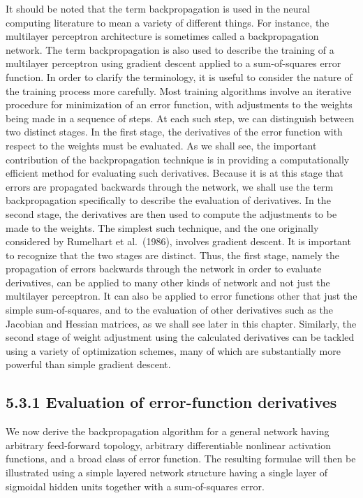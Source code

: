 \documentclass[
  10
]{article}
\begin{document}
It should be noted that the term backpropagation is used in the neural
computing literature to mean a variety of different things. For
instance, the multilayer perceptron architecture is sometimes called a
backpropagation network. The term backpropagation is also used to
describe the training of a multilayer perceptron using gradient descent
applied to a sum-of-squares error function. In order to clarify the
terminology, it is useful to consider the nature of the training process
more carefully. Most training algorithms involve an iterative procedure
for minimization of an error function, with adjustments to the weights
being made in a sequence of steps. At each such step, we can distinguish
between two distinct stages. In the first stage, the derivatives of the
error function with respect to the weights must be evaluated. As we
shall see, the important contribution of the backpropagation technique
is in providing a computationally efficient method for evaluating such
derivatives. Because it is at this stage that errors are propagated
backwards through the network, we shall use the term backpropagation
specifically to describe the evaluation of derivatives. In the second
stage, the derivatives are then used to compute the adjustments to be
made to the weights. The simplest such technique, and the one originally
considered by Rumelhart et al.~(1986), involves gradient descent. It is
important to recognize that the two stages are distinct. Thus, the first
stage, namely the propagation of errors backwards through the network in
order to evaluate derivatives, can be applied to many other kinds of
network and not just the multilayer perceptron. It can also be applied
to error functions other that just the simple sum-of-squares, and to the
evaluation of other derivatives such as the Jacobian and Hessian
matrices, as we shall see later in this chapter. Similarly, the second
stage of weight adjustment using the calculated derivatives can be
tackled using a variety of optimization schemes, many of which are
substantially more powerful than simple gradient descent.

\subsection{5.3.1 Evaluation of error-function
derivatives}\label{evaluation-of-error-function-derivatives}

We now derive the backpropagation algorithm for a general network having
arbitrary feed-forward topology, arbitrary differentiable nonlinear
activation functions, and a broad class of error function. The resulting
formulae will then be illustrated using a simple layered network
structure having a single layer of sigmoidal hidden units together with
a sum-of-squares error.
\end{document}
